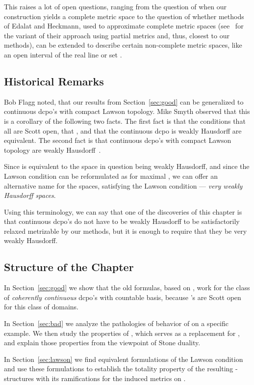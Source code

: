 This raises a lot of open questions, ranging from the question
of when our construction yields a complete metric space to
the question of whether methods of Edalat and Heckmann, used to
approximate complete metric spaces (see~\cite{Heckmann} for
the variant of their approach using partial metrics and, thus,
closest to our methods), can be extended to describe certain
non-complete metric spaces, like an open interval of the real line
or set .

\subsection{Historical Remarks}

Bob Flagg noted, that our results from Section~\ref{sec:good}
can be generalized to continuous dcpo's with compact Lawson topology.
Mike Smyth observed that this is a corollary of the following two facts.
The first fact is
that the conditions that all  are Scott open, that ,
and that the continuous dcpo is weakly Hausdorff are equivalent.
The second fact is that continuous dcpo's with compact
Lawson topology are weakly Hausdorff~\cite{Smyth2}.

Since  is equivalent to the space in question being weakly
Hausdorff, and since the Lawson condition can be reformulated as
 for maximal , we can offer an alternative name for
the spaces, satisfying the Lawson condition --- {\em very weakly
Hausdorff spaces}.

Using this terminology, we can say that one of the discoveries
of this chapter is that continuous dcpo's do not have to be
weakly Hausdorff to be satisfactorily 
relaxed metrizable by our methods,
but it is enough to require that they be very weakly Hausdorff.

\subsection{Structure of the Chapter}

In Section~\ref{sec:good} we show that the old formulas, based on ,
work for the class of {\em coherently continuous} dcpo's with countable
basis,
because 's are Scott open for this class of domains.

In Section~\ref{sec:bad} we analyze the pathologies of behavior
of  on a specific example. We then study the properties of
, which serves as a replacement for , and explain those
properties from the viewpoint of Stone duality.

In Section~\ref{sec:lawson} we find equivalent formulations of
the Lawson condition and use these formulations to establish the
totality property of the resulting -structures
with its ramifications for the induced metrics on .

